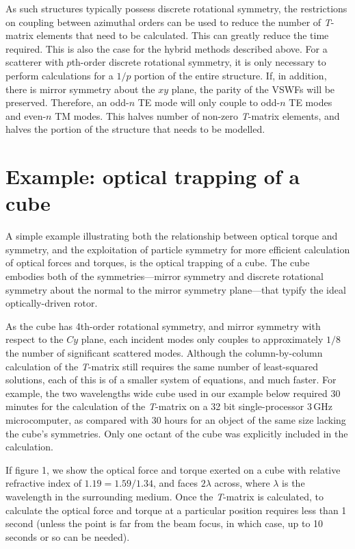 \documentclass{article}
\begin{document}
As such structures typically possess discrete rotational symmetry,
the restrictions on coupling between azimuthal orders can be used
to reduce the number of \textit{T}-matrix elements that need to
be calculated. This can greatly reduce the time required. This
is also the case for the hybrid methods described above. For a scatterer
with $p$th-order discrete rotational symmetry, it is only necessary
to perform calculations for a $1/p$ portion of the entire structure.
If, in addition, there is mirror symmetry about the $xy$ plane, the
parity of the VSWFs will be preserved. Therefore, an odd-$n$ TE mode
will only couple to odd-$n$ TE modes and even-$n$ TM modes. This halves
number of non-zero \textit{T}-matrix elements, and halves the portion
of the structure that needs to be modelled.

\section{Example: optical trapping of a cube}

A simple example illustrating both the relationship between optical
torque and symmetry, and the exploitation of particle symmetry for
more efficient calculation of optical forces and torques,
is the optical trapping of a cube. The cube embodies both
of the symmetries---mirror symmetry and discrete rotational
symmetry about the normal to the mirror symmetry plane---that
typify the ideal optically-driven rotor.

As the cube has 4th-order rotational symmetry, and mirror symmetry
with respect to the $Cy$ plane, each incident modes only couples to
approximately $1/8$ the number of significant scattered modes.
Although the column-by-column calculation of the \textit{T}-matrix
still requires the same number of least-squared solutions, each of
this is of a smaller system of equations, and much faster.
For example, the two wavelengths wide cube used in our example below
required 30 minutes for the calculation of the \textit{T}-matrix
on a 32 bit single-processor 3\,GHz microcomputer, as compared with
30 hours for an object of the same size lacking the cube's symmetries.
Only one octant of the cube was explicitly included in the
calculation.

If figure 1, we show the optical force and torque exerted on a
cube with relative refractive index of $1.19 = 1.59/1.34$, and faces
$2\lambda$ across, where $\lambda$ is the wavelength in the surrounding
medium. Once the \textit{T}-matrix is calculated, to calculate the
optical force and torque at a particular position requires less than
1 second (unless the point is far from the beam focus, in which case,
up to 10 seconds or so can be needed).
\end{document}
